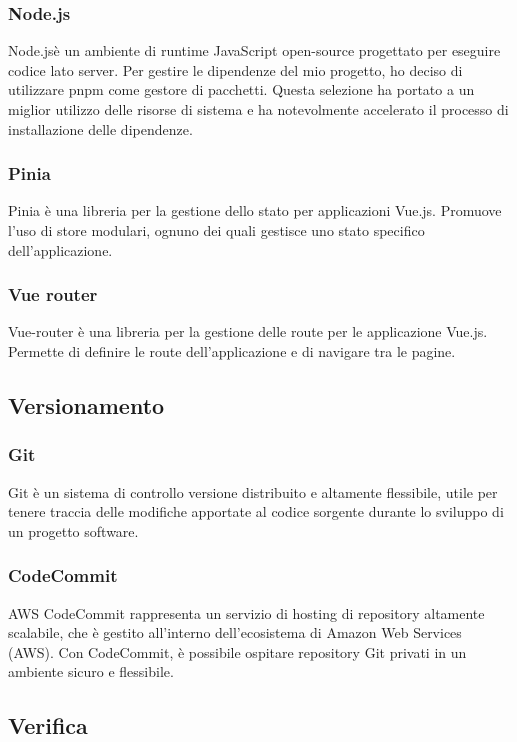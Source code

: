 \subsubsection{Node.js}\label{subsubsec:node.js}
Node.jsè un ambiente di runtime JavaScript open-source progettato per eseguire codice lato server. Per gestire le dipendenze del mio progetto,
ho deciso di utilizzare pnpm come gestore di pacchetti. Questa selezione ha portato a un miglior utilizzo delle risorse di sistema e ha notevolmente accelerato il processo di 
installazione delle dipendenze.
 \subsubsection{Pinia}\label{subsubsec:pinia}
Pinia è una libreria per la gestione dello stato per applicazioni Vue.js. Promuove l'uso di store modulari, ognuno dei quali gestisce uno stato specifico dell'applicazione.
\subsubsection{Vue router}\label{subsubsec:vue-router}
Vue-router è una libreria per la gestione delle route per le applicazione Vue.js. Permette di definire le route dell'applicazione e di navigare tra le pagine.

\subsection{Versionamento}\label{subsec:versionamento}
\subsubsection{Git}\label{subsubsec:git}
Git è un sistema di controllo versione distribuito e altamente flessibile, utile per tenere traccia delle modifiche apportate al codice sorgente durante lo sviluppo di un progetto software.
\subsubsection{CodeCommit}\label{subsubsec:CodeCommit}
AWS CodeCommit rappresenta un servizio di hosting di repository altamente scalabile, che è gestito all'interno dell'ecosistema di Amazon Web Services (AWS). 
Con CodeCommit, è possibile ospitare repository Git privati in un ambiente sicuro e flessibile.

\subsection{Verifica}\label{subsec:verifica}
